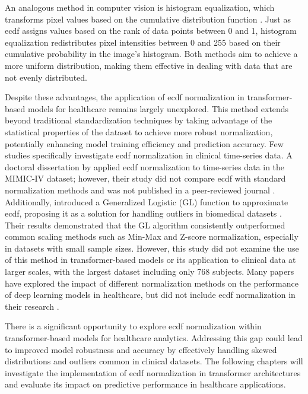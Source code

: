 
An analogous method in computer vision is histogram equalization, which transforms pixel values based on the cumulative distribution function \cite{DigitalImageProcessing}. Just as \gls{ecdf} assigns values based on the rank of data points between \num{0} and \num{1}, histogram equalization redistributes pixel intensities between \num{0} and \num{255} based on their cumulative probability in the image's histogram. Both methods aim to achieve a more uniform distribution, making them effective in dealing with data that are not evenly distributed.


Despite these advantages, the application of \gls{ecdf} normalization in transformer-based models for healthcare remains largely unexplored. This method extends beyond traditional standardization techniques by taking advantage of the statistical properties of the dataset to achieve more robust normalization, potentially enhancing model training efficiency and prediction accuracy. Few studies specifically investigate \gls{ecdf} normalization in clinical time-series data. A doctoral dissertation by \citeauthor{WhatsMissingMachine2023} applied \gls{ecdf} normalization to time-series data in the MIMIC-IV dataset; however, their study did not compare \gls{ecdf} with standard normalization methods and was not published in a peer-reviewed journal \cite[][64]{WhatsMissingMachine2023}. Additionally, \citeauthor{RobustDataScaling2016} introduced a Generalized Logistic (GL) function to approximate \gls{ecdf}, proposing it as a solution for handling outliers in biomedical datasets \cite{RobustDataScaling2016}. Their results demonstrated that the GL algorithm consistently outperformed common scaling methods such as Min-Max and Z-score normalization, especially in datasets with small sample sizes. However, this study did not examine the use of this method in transformer-based models or its application to clinical data at larger scales, with the largest dataset including only 768 subjects. Many papers have explored the impact of different normalization methods on the performance of deep learning models in healthcare, but did not include \gls{ecdf} normalization in their research \cite{ExploringEffectNormalization2021,DataNormalizationTask2022,ChoiceScalingTechnique2023}.

There is a significant opportunity to explore \gls{ecdf} normalization within transformer-based models for healthcare analytics. Addressing this gap could lead to improved model robustness and accuracy by effectively handling skewed distributions and outliers common in clinical datasets. The following chapters will investigate the implementation of \gls{ecdf} normalization in transformer architectures and evaluate its impact on predictive performance in healthcare applications.

